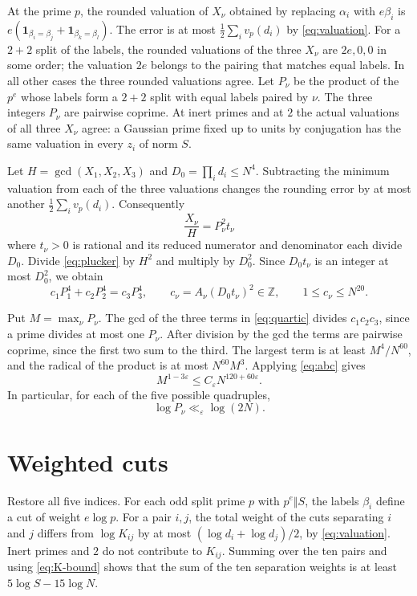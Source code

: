 \documentclass[11pt,reqno]{amsart}
\newcommand{\Z}{\mathbb{Z}}
\begin{document}
At the prime $p$, the rounded valuation of $X_\nu$ obtained by
replacing $\alpha_i$ with $e\beta_i$ is
$e(\mathbf{1}_{\beta_i=\beta_j}+\mathbf{1}_{\beta_k=\beta_l})$.
The error is at most $\tfrac12\sum_i v_p(d_i)$ by \eqref{eq:valuation}.
For a $2+2$ split of the labels, the rounded valuations of the
three $X_\nu$ are $2e,0,0$ in some order; the valuation $2e$
belongs to the pairing that matches equal labels. In all other cases
the three rounded valuations agree. Let $P_\nu$ be the product of
the $p^e$ whose labels form a $2+2$ split with equal labels paired by $\nu$.
The three integers $P_\nu$ are pairwise coprime. At inert primes and at
$2$ the actual valuations of all three $X_\nu$ agree: a Gaussian prime
fixed up to units by conjugation has the same valuation in every $z_i$
of norm $S$.

Let $H=\gcd(X_1,X_2,X_3)$ and $D_0=\prod_i d_i\le N^4$. Subtracting
the minimum valuation from each of the three valuations changes the
rounding error by at most another $\tfrac12\sum_i v_p(d_i)$.
Consequently
\[
 \frac{X_\nu}{H}=P_\nu^2 t_\nu
\]
where $t_\nu>0$ is rational and its reduced numerator and denominator
each divide $D_0$. Divide \eqref{eq:plucker} by $H^2$ and multiply by
$D_0^2$. Since $D_0 t_\nu$ is an integer at most $D_0^2$, we obtain
\begin{equation}\label{eq:quartic}
 c_1P_1^4+c_2P_2^4=c_3P_3^4,\qquad
 c_\nu=A_\nu(D_0t_\nu)^2\in\Z,\qquad 1\le c_\nu\le N^{20}.
\end{equation}

Put $M=\max_\nu P_\nu$. The gcd of the three terms in
\eqref{eq:quartic} divides $c_1c_2c_3$, since a prime divides at most
one $P_\nu$. After division by the gcd the terms are pairwise coprime,
since the first two sum to the third. The largest term is at least
$M^4/N^{60}$, and the radical of the product is at most $N^{60}M^3$.
Applying \eqref{eq:abc} gives
\[
 M^{1-3\varepsilon}\le C_\varepsilon N^{120+60\varepsilon}.
\]
In particular, for each of the five possible quadruples,
\begin{equation}\label{eq:P-bound}
 \log P_\nu\ll_\varepsilon\log(2N).
\end{equation}

\section{Weighted cuts}

Restore all five indices. For each odd split prime $p$ with $p^e\Vert S$,
the labels $\beta_i$ define a cut of weight $e\log p$. For a pair
$i,j$, the total weight of the cuts separating $i$ and $j$ differs
from $\log K_{ij}$ by at most $(\log d_i+\log d_j)/2$, by
\eqref{eq:valuation}. Inert primes and $2$ do not contribute to
$K_{ij}$. Summing over the ten pairs and using \eqref{eq:K-bound}
shows that the sum of the ten separation weights is at least
$5\log S-15\log N$.
\end{document}
